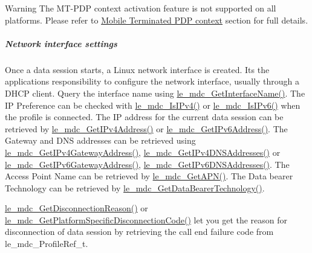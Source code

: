 \begin{DoxyWarning}{Warning}
The M\+T-\/\+P\+DP context activation feature is not supported on all platforms. Please refer to \hyperlink{platformConstraintsMdc_MT-PDP_context}{Mobile Terminated P\+DP context} section for full details.
\end{DoxyWarning}
\hypertarget{c_mdc_le_mdc_session_networkItf}{}\subparagraph{Network interface settings}\label{c_mdc_le_mdc_session_networkItf}
Once a data session starts, a Linux network interface is created. It\textquotesingle{}s the application\textquotesingle{}s responsibility to configure the network interface, usually through a D\+H\+CP client. Query the interface name using \hyperlink{le__mdc__interface_8h_a4c22a8691d6e6a69270a7ed6ab9974af}{le\+\_\+mdc\+\_\+\+Get\+Interface\+Name()}. The IP Preference can be checked with \hyperlink{le__mdc__interface_8h_aa3912e94864a6e5862e07f58b3772cba}{le\+\_\+mdc\+\_\+\+Is\+I\+Pv4()} or \hyperlink{le__mdc__interface_8h_adde11de0b17b2c937acca6355b6fba11}{le\+\_\+mdc\+\_\+\+Is\+I\+Pv6()} when the profile is connected. The IP address for the current data session can be retrieved by \hyperlink{le__mdc__interface_8h_a0b5e11efda06472fc6c525101fceafe6}{le\+\_\+mdc\+\_\+\+Get\+I\+Pv4\+Address()} or \hyperlink{le__mdc__interface_8h_a73ef38d4d2399580d552b12c62f1c508}{le\+\_\+mdc\+\_\+\+Get\+I\+Pv6\+Address()}. The Gateway and D\+NS addresses can be retrieved using \hyperlink{le__mdc__interface_8h_a290cff563b19ee4891bcd5c8908c54f9}{le\+\_\+mdc\+\_\+\+Get\+I\+Pv4\+Gateway\+Address()}, \hyperlink{le__mdc__interface_8h_a0dd0dcf60d647388fa3e1973917a6161}{le\+\_\+mdc\+\_\+\+Get\+I\+Pv4\+D\+N\+S\+Addresses()} or \hyperlink{le__mdc__interface_8h_a3bb60671304e2b4d3b23d8e623f9940c}{le\+\_\+mdc\+\_\+\+Get\+I\+Pv6\+Gateway\+Address()}, \hyperlink{le__mdc__interface_8h_ad9cb7d3299620d9dcde551cec45389a1}{le\+\_\+mdc\+\_\+\+Get\+I\+Pv6\+D\+N\+S\+Addresses()}. The Access Point Name can be retrieved by \hyperlink{le__mdc__interface_8h_afc0c149bfa4455f3e9a8ccc06f0c5fed}{le\+\_\+mdc\+\_\+\+Get\+A\+P\+N()}. The Data bearer Technology can be retrieved by \hyperlink{le__mdc__interface_8h_a1b17bb87b347162013b5ad608cdcda2d}{le\+\_\+mdc\+\_\+\+Get\+Data\+Bearer\+Technology()}.

\hyperlink{le__mdc__interface_8h_afe73f44c23b1bd120dd82a85b36c6059}{le\+\_\+mdc\+\_\+\+Get\+Disconnection\+Reason()} or \hyperlink{le__mdc__interface_8h_a3e3a92b0f5e3edab9400412170517a62}{le\+\_\+mdc\+\_\+\+Get\+Platform\+Specific\+Disconnection\+Code()} let you get the reason for disconnection of data session by retrieving the call end failure code from {\ttfamily le\+\_\+mdc\+\_\+\+Profile\+Ref\+\_\+t}.

